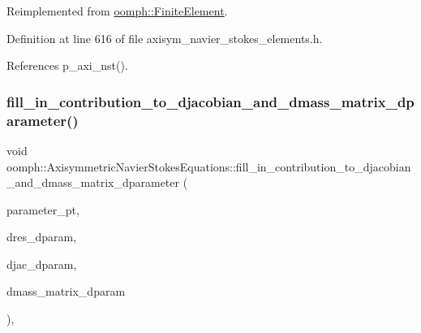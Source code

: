 Reimplemented from \hyperlink{classoomph_1_1FiniteElement_a92ef8967fa4e2d6c33c51ea3efa3aa82}{oomph\+::\+Finite\+Element}.



Definition at line 616 of file axisym\+\_\+navier\+\_\+stokes\+\_\+elements.\+h.



References p\+\_\+axi\+\_\+nst().

\mbox{\label{classoomph_1_1AxisymmetricNavierStokesEquations_aa52f3f082e2dc8b2c0bc99215dc3ce02}} 
\subsubsection{\texorpdfstring{fill\+\_\+in\+\_\+contribution\+\_\+to\+\_\+djacobian\+\_\+and\+\_\+dmass\+\_\+matrix\+\_\+dparameter()}{fill\_in\_contribution\_to\_djacobian\_and\_dmass\_matrix\_dparameter()}}
{\footnotesize\ttfamily void oomph\+::\+Axisymmetric\+Navier\+Stokes\+Equations\+::fill\+\_\+in\+\_\+contribution\+\_\+to\+\_\+djacobian\+\_\+and\+\_\+dmass\+\_\+matrix\+\_\+dparameter (\begin{DoxyParamCaption}\item[{double $\ast$const \&}]{parameter\+\_\+pt,  }\item[{\hyperlink{classoomph_1_1Vector}{Vector}$<$ double $>$ \&}]{dres\+\_\+dparam,  }\item[{\hyperlink{classoomph_1_1DenseMatrix}{Dense\+Matrix}$<$ double $>$ \&}]{djac\+\_\+dparam,  }\item[{\hyperlink{classoomph_1_1DenseMatrix}{Dense\+Matrix}$<$ double $>$ \&}]{dmass\+\_\+matrix\+\_\+dparam }\end{DoxyParamCaption})\hspace{0.3cm}{\ttfamily [inline]}, {\ttfamily [virtual]}}

